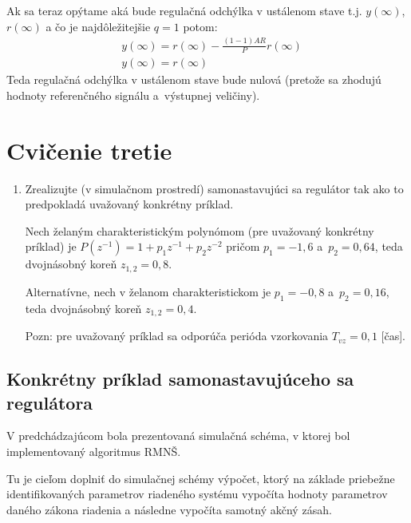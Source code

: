 \documentclass[a4paper, 10pt, ]{article}
\begin{document}
Ak sa teraz opýtame aká bude regulačná odchýlka v ustálenom stave t.j. $y(\infty)$, $r(\infty)$ a čo je najdôležitejšie $q = 1$ potom:
\begin{equation}
	\begin{split}
		& y(\infty) =r(\infty) -  \frac{(1-1)AR}{P}r(\infty)
		\\& y(\infty) =r(\infty)
	\end{split}
\end{equation}
Teda regulačná odchýlka v ustálenom stave bude nulová (pretože sa zhodujú hodnoty referenčného signálu a~výstupnej veličiny).











\section{Cvičenie tretie}
\label{cvictretie}


\begin{enumerate}[leftmargin=0pt, labelsep=4mm, itemsep=0pt]

	\item Zrealizujte (v simulačnom prostredí) samonastavujúci sa regulátor tak ako to predpokladá uvažovaný konkrétny príklad.

	Nech želaným charakteristickým polynómom (pre uvažovaný konkrétny príklad) je $P(z^{-1}) = 1 + p_1z^{-1} + p_2z^{-2}$ pričom $p_1 = -1,6$ a~$p_2 = 0,64$, teda dvojnásobný koreň $z_{1,2} = 0,8$.

	Alternatívne, nech v želanom charakteristickom je $p_1 = -0,8$ a~$p_2 = 0,16$, teda dvojnásobný koreň $z_{1,2} = 0,4$.

	Pozn: pre uvažovaný príklad sa odporúča perióda vzorkovania $T_{vz} = 0,1$ [čas].

\end{enumerate}



\subsection{Konkrétny príklad samonastavujúceho sa regulátora}


V predchádzajúcom bola prezentovaná simulačná schéma, v ktorej bol implementovaný algoritmus RMNŠ.

Tu je cieľom doplniť do simulačnej schémy výpočet, ktorý na základe priebežne identifikovaných parametrov riadeného systému vypočíta hodnoty parametrov daného zákona riadenia a následne vypočíta samotný akčný zásah.
\end{document}
